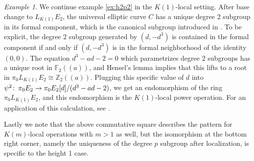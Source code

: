 \documentclass{gtpart}
\theoremstyle{definition}
\theoremstyle{remark}
\newtheorem{exam}[thm]{Example}
\def\co{\colon\thinspace}
\newcommand{\mb}[1]{\mathbb{#1}}
\begin{document}
\begin{exam}
\label{ex:h1p2}
We continue example \ref{ex:h2p2} in the $K(1)$-local setting.  After base 
change to $L_{K(1)} E_2$, the universal elliptic curve $C$ has a 
unique degree 2 subgroup in its formal component, 
which is the canonical subgroup introduced in \cite{lubin}.  
To be explicit, the degree 2 subgroup generated by $(d,-d^3)$ 
is contained in the formal component if and only if $(d,-d^3)$ 
is in the formal neighborhood of the identity $(0,0)$.  The 
equation $d^3 - a d - 2 = 0$ which parametrizes degree 2 subgroups has a unique root in ${\mb F}_2 (\!(a)\!)$, 
and Hensel's lemma implies that this lifts to a root in $\pi_0 L_{K(1)} E_2 \cong {\mb Z}_2 (\!(a)\!)$.  
Plugging this specific value of $d$ into 
$\psi^2\co \pi_0 E_2 \to \pi_0 E_2 [d]/(d^3-ad-2)$, we get an 
endomorphism of the ring $\pi_0 L_{K(1)} E_2$, and this 
endomorphism is the $K(1)$-local power operation.  For an 
application of this calculation, see \cite[section 6]{level3}.
\end{exam}

Lastly we note that the above commutative square describes the 
pattern for $K(m)$-local operations with $m > 1$ as well, but the 
isomorphism at the bottom right corner, namely the uniqueness of 
the degree $p$ subgroup after localization, is specific to the height 1 case.
\end{document}
